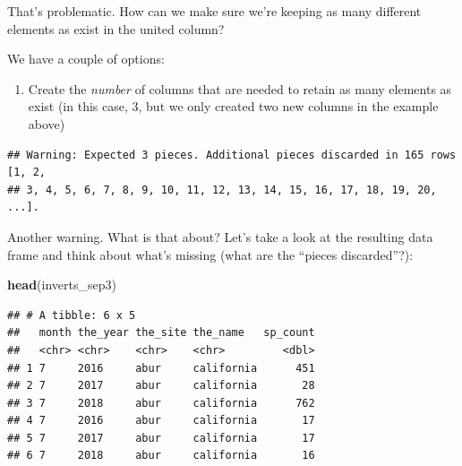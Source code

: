 \documentclass[]{book}
\newenvironment{Shaded}{\begin{snugshade}}{\end{snugshade}}
\newcommand{\DataTypeTok}[1]{\textcolor[rgb]{0.13,0.29,0.53}{#1}}
\newcommand{\KeywordTok}[1]{\textcolor[rgb]{0.13,0.29,0.53}{\textbf{#1}}}
\newcommand{\NormalTok}[1]{#1}
\newcommand{\OperatorTok}[1]{\textcolor[rgb]{0.81,0.36,0.00}{\textbf{#1}}}
\newcommand{\StringTok}[1]{\textcolor[rgb]{0.31,0.60,0.02}{#1}}
\providecommand{\tightlist}{%
  \setlength{\itemsep}{0pt}\setlength{\parskip}{0pt}}
\begin{document}
That's problematic. How can we make sure we're keeping as many different elements as exist in the united column?

We have a couple of options:

\begin{enumerate}
\def\labelenumi{\arabic{enumi}.}
\tightlist
\item
  Create the \emph{number} of columns that are needed to retain as many elements as exist (in this case, 3, but we only created two new columns in the example above)
\end{enumerate}

\begin{Shaded}
\end{Shaded}

\begin{verbatim}
## Warning: Expected 3 pieces. Additional pieces discarded in 165 rows [1, 2,
## 3, 4, 5, 6, 7, 8, 9, 10, 11, 12, 13, 14, 15, 16, 17, 18, 19, 20, ...].
\end{verbatim}

Another warning. What is that about? Let's take a look at the resulting data frame and think about what's missing (what are the ``pieces discarded''?):

\begin{Shaded}
\begin{Highlighting}[]
\KeywordTok{head}\NormalTok{(inverts_sep3)}
\end{Highlighting}
\end{Shaded}

\begin{verbatim}
## # A tibble: 6 x 5
##   month the_year the_site the_name   sp_count
##   <chr> <chr>    <chr>    <chr>         <dbl>
## 1 7     2016     abur     california      451
## 2 7     2017     abur     california       28
## 3 7     2018     abur     california      762
## 4 7     2016     abur     california       17
## 5 7     2017     abur     california       17
## 6 7     2018     abur     california       16
\end{verbatim}
\end{document}

